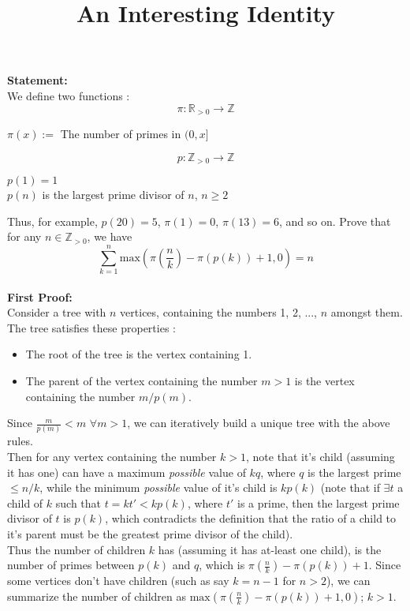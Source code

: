 \documentclass{article}
\title{\textbf{An Interesting Identity}}
\begin{document}
\maketitle
\noindent
{\bf Statement:}\\ 
We define two functions :
$$ \pi : \mathbb{R}_{>0}\longrightarrow\mathbb{Z} $$
\begin{center}
    $ \pi(x) := $ The number of primes in $ (0, x] $
\end{center}
$$ p : \mathbb{Z}_{>0}\longrightarrow\mathbb{Z} $$
\begin{center}
    $p(1) = 1$\\
    $p(n)$ is the largest prime divisor of  $n$, $n \geq 2$
\end{center}
Thus, for example, $p(20) = 5$, $\pi(1) = 0$, $\pi(13) = 6$, and so on.
Prove that for any $n \in \mathbb{Z}_{>0}$, we have\\
$$\sum_{k=1}^{n} \mathrm{max}(\pi(\frac{n}{k}) - \pi(p(k)) + 1, 0) = n$$
\\
\noindent
{\bf First Proof:}\\ 
Consider a tree with $n$ vertices, containing the numbers 1, 2, ..., $n$ amongst them. The tree satisfies these properties :
\begin{itemize}
    \item The root of the tree is the vertex containing 1.
    \item The parent of the vertex containing the number $m > 1$ is the vertex containing the number $m/p(m)$.
\end{itemize}
Since $\frac{m}{p(m)} < m$ $\forall m > 1$, we can iteratively build a unique tree with the above rules.\\
Then for any vertex containing the number $k > 1$, note that it's child (assuming it has one) can have a maximum \emph{possible} value of $kq$, where $q$ is the largest prime $\leq n/k$, while the minimum \emph{possible} value of it's child is $kp(k)$ (note that if $\exists t$ a child of $k$ such that $t = kt' < kp(k)$, where $t'$ is a prime, then the largest prime divisor of $t$ is $p(k)$, which contradicts the definition that the ratio of a child to it's parent must be the greatest prime divisor of the child).\\
Thus the number of children $k$ has (assuming it has at-least one child), is the number of primes between $p(k)$ and $q$, which is $\pi(\frac{n}{k}) - \pi(p(k)) + 1$. Since some vertices don't have children (such as say $k = n -1$ for $n > 2$), we can summarize the number of children as $\mathrm{max}(\pi(\frac{n}{k}) - \pi(p(k)) + 1, 0)$; $k > 1$.\\
\end{document}
